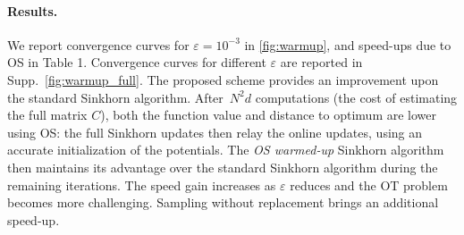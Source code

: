\paragraph{Results.} We report convergence curves for $\varepsilon = 10^{-3}$ in
\autoref{fig:warmup}, and speed-ups due to OS in Table 1. Convergence curves for
different $\varepsilon$ are reported in Supp.~\autoref{fig:warmup_full}. The
proposed scheme provides an improvement upon the standard Sinkhorn algorithm.
After $N^2 d$ computations (the cost of estimating the full matrix $C$), both
the function value and distance to optimum are lower using OS: the full Sinkhorn
updates then relay the online updates, using an accurate initialization of the
potentials. The \textit{OS warmed-up} Sinkhorn algorithm then maintains its
advantage over the standard Sinkhorn algorithm during the remaining iterations.
The speed gain increases as $\varepsilon$ reduces and the OT problem becomes
more challenging. Sampling without replacement brings an additional speed-up.
